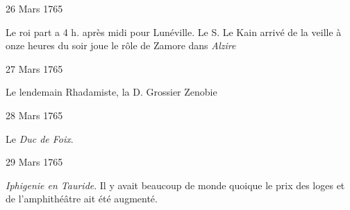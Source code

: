                      \begin{diary}{26 Mars 1765}{}
                        
                        
                           Le roi part a 4 h. après midi
                           pour Lunéville.
                           Le S. Le Kain arrivé de la veille
                           à onze heures
                           du soir joue le rôle de Zamore dans \emph{Alzire}
                        \bigskip
        
        
                     \end{diary}

                     \begin{diary}{27 Mars 1765}{}
                        
                         Le lendemain Rhadamiste, la D. Grossier Zenobie \bigskip
        
        
                     \end{diary}
                     
                     \begin{diary}{28 Mars 1765}{}
                        
                         Le \emph{Duc de
                              Foix}. \bigskip
        
        
                     \end{diary}

                     \begin{diary}{29 Mars 1765}{}
                        
                        
                           \emph{Iphigenie en Tauride}. Il y avait beaucoup
                           de monde quoique le prix des loges et de
                           l'amphithéâtre ait été augmenté. \bigskip
        
        
                     \end{diary}

